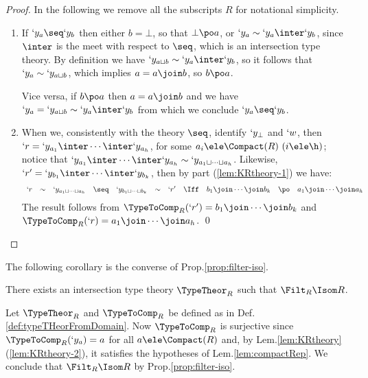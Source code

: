 \documentclass{lmcs}
\begin{document}
 \begin{proof} In the following we remove all the subscripts $R$ for notational simplicity.

 \begin{enumerate}

 \item 
If $`y_a \seq `y_b$ then either $b = \bot $, so that $\bot \po a$, or
$`y_a \sim `y_a \inter `y_b$, since $\inter$ is the meet with respect to $\seq$, which is an intersection type theory. 
By definition we have $`y_{a \sqcup b} \sim `y_a \inter `y_b$, so it follows that $`y_a \sim `y_{a \sqcup b}$, which implies $a = a \join b $, so $b \po a$.

Vice versa, if $b \po a$ then $a = a \join b$ and we have $`y_a = `y_{a \sqcup b} \sim `y_a \inter `y_b$ from which we conclude $`y_a \seq `y_b$.
	
 \item 
When we, consistently with the theory $\seq$, identify $`y_\bot$ and $`w$, then $`r = `y_ {a_1}\inter \cdots \inter `y_{a_h}$, for some $a_i \ele \Compact(R) ~ (i \ele \h)$; notice that $`y_ {a_1}\inter \cdots \inter `y_{a_h} \sim `y_{a_1\sqcup\cdots\sqcup a_h}$. 
Likewise, $`r' = `y_ {b_1}\inter \cdots \inter `y_{b_k } $, then by part (\ref{lem:KRtheory-1}) we have:
%
 \[ \begin{array}{rcl@{\quad}lccc@{\quad}c@{\quad}ccc}
`r 
	& \sim & 
`y_{a_1\sqcup\cdots\sqcup a_h} 
	& \seq & 
`y_{b_1\sqcup\cdots\sqcup b_k } 
	& \sim & 
`r' 
	&\Iff&
b_1\join\cdots\join b_k 
	&\po&
a_1\join\cdots\join a_h
 \end{array} \]
The result follows from %
$\TypeToComp_R(`r') = b_1\join\cdots\join b_k$ and $\TypeToComp_R(`r) = a_1\join\cdots\join a_h$.%
\qed
 \end{enumerate}
 \end{proof}

The following corollary is the converse of Prop.\skp\ref{prop:filter-iso}.


 \begin{cor} \label{cor:fromDomToFilter}
There exists an intersection type theory $\TypeTheor_R$ such that $\Filt_R \Isom R$.
 \end{cor}

 \begin{Proof}
Let $\TypeTheor_R$ and $\TypeToComp_R$ be defined as in Def.\skp\ref{def:typeTHeorFromDomain}.
Now $\TypeToComp_R$ is surjective since $\TypeToComp_R(`y_a) = a$ for all $a\ele \Compact(R)$ and, by Lem.\skp\ref{lem:KRtheory}\,(\ref{lem:KRtheory-2}), it satisfies the hypotheses of Lem.\skp\ref{lem:compactRep}.
We conclude that $\Filt_R \Isom R$ by Prop.\skp\ref{prop:filter-iso}. %
 \end{Proof}
\end{document}
